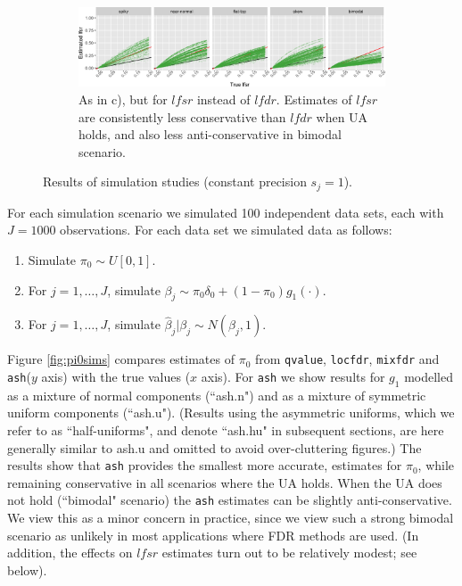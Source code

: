 \documentclass[11pt]{article}
\def\lfdr{\textit{lfdr}}
\def\lfsr{\textit{lfsr}}
\def\bhat{\hat{\beta}}
\def\shat{\hat{s}}
\def\qvalue{{\tt qvalue}\xspace}
\def\locfdr{{\tt locfdr}\xspace}
\def\mixfdr{{\tt mixfdr}\xspace}
\def\ash{{\tt ash}\xspace}
\begin{document}
\begin{figure}
\begin{center}
\begin{subfigure}{\textwidth}
\includegraphics[width=\textwidth]{../analysis/figure/plot_lfsr.Rmd/plot_lfsr-1.png} 
\caption{As in c), but for $\lfsr$ instead of $\lfdr$. Estimates of $\lfsr$ are consistently less conservative than $\lfdr$ when UA holds, and also less anti-conservative in bimodal scenario.}  \label{fig:lfsr}
\end{subfigure}
\end{center}
\caption{Results of simulation studies (constant precision $s_j=1$).}
\end{figure}


For each simulation scenario we simulated 100 independent data sets, each with $J=1000$ observations. For each data set we simulated
data as follows:
\begin{enumerate}
\item Simulate $\pi_0  \sim U[0,1]$.
\item For $j=1,\dots,J$, simulate $\beta_j \sim \pi_0 \delta_0 + (1-\pi_0) g_1(\cdot)$.
\item For $j=1,\dots,J$, simulate $\bhat_j | \beta_j \sim N(\beta_j,1)$.
\end{enumerate}

Figure \ref{fig:pi0sims} compares estimates of $\pi_0$ from \qvalue, \locfdr, \mixfdr and \ash ($y$ axis) with the true values ($x$ axis). 
For \ash we show results for $g_1$ modelled as a mixture of normal components (``ash.n") 
and as a mixture of symmetric uniform components (``ash.u"). (Results using the asymmetric uniforms, which we refer to
as ``half-uniforms", and denote ``ash.hu" in subsequent sections, are here generally similar to ash.u and omitted to avoid over-cluttering figures.)
The results show that \ash provides the smallest more accurate, estimates for $\pi_0$, while remaining conservative
in all scenarios where the UA holds. When the UA does not hold (``bimodal" scenario) the \ash estimates can be slightly anti-conservative.
We view this as a minor concern in practice, since we view such a strong bimodal scenario as unlikely in most applications where FDR methods
are used. (In addition, the effects on $\lfsr$ estimates turn out to be relatively modest; see below). 
\end{document}
